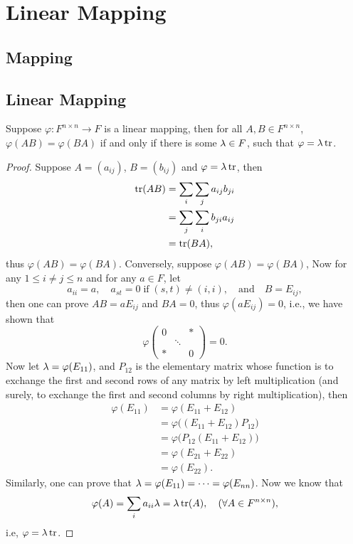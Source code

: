 \chapter{Linear Mapping}
\section{Mapping}

\section{Linear Mapping}

\begin{pro}%
	Suppose $\varphi\colon F^{n\times n}\to F$ is a linear mapping, then for all $A,B\in F^{n\times n}$, 
	$\varphi(AB)=\varphi(BA)$ if and only if there is some $\lambda\in F$, such that $\varphi=\lambda\operatorname*{tr}$.
\end{pro}
\begin{proof}
	Suppose $A=(a_{ij})$, $B=(b_{ij})$ and $\varphi=\lambda \operatorname*{tr}$, then
	\begin{align*}
	\operatorname*{tr}(AB)&=\sum_{i}\sum_{j}a_{ij}b_{ji}\\
		   &=\sum_{j}\sum_{i}b_{ji}a_{ij}\\
		   &=\operatorname*{tr}(BA),
	\end{align*}
	thus $\varphi(AB)=\varphi(BA)$. Conversely, suppose $\varphi(AB)=\varphi(BA)$, Now for any $1\leq i\neq j\leq n$
	and for any $a\in F$, let	
	\[a_{ii}=a,\quad a_{st}=0\;\mbox{if}\;(s,t)\neq (i,i),\quad\mbox{and}\quad B=E_{ij},\]
	then one can prove $AB=aE_{ij}$ and $BA=0$, thus $\varphi(aE_{ij})=0$, i.e., we have shown that
	\[\varphi\begin{pmatrix}
	0 & & *\\
	  &\ddots& \\
	* & & 0\end{pmatrix}=0.\]
	Now let $\lambda=\varphi(E_{11})$, and $P_{12}$ is the elementary matrix whose function is to exchange the first and second rows of any matrix by left multiplication (and surely, to exchange the first and second columns by right multiplication), then
	\begin{align*}
		\varphi(E_{11})&=\varphi(E_{11}+E_{12})\\
					&=\varphi\big((E_{11}+E_{12})P_{12}\big)\\
					&=\varphi\big(P_{12}(E_{11}+E_{12})\big)\\
					&=\varphi(E_{21}+E_{22})\\
					&=\varphi(E_{22}).
	\end{align*}
	Similarly, one can prove that $\lambda=\varphi(E_{11})=\dots=\varphi(E_{nn})$. Now we know that 
	\[\varphi(A)=\sum_i a_{ii} \lambda=\lambda \operatorname*{tr}(A),\quad(\forall A\in F^{n\times n}),\]
	i.e, $\varphi=\lambda\operatorname*{tr}$.
\end{proof}

